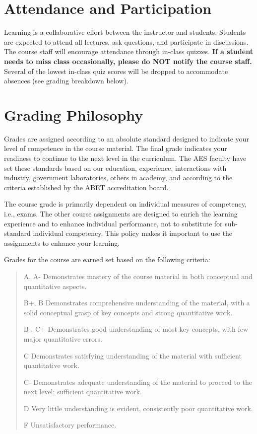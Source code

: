 \documentclass[9pt]{article}
\begin{document}
\section*{Attendance and Participation}

Learning is a collaborative effort between the instructor and students. Students are expected to attend all lectures, ask questions, and participate in discussions. The course staff will encourage attendance through in-class quizzes. \textbf{If a student needs to miss class occasionally, please do NOT notify the course staff.} Several of the lowest in-class quiz scores will be dropped to accommodate absences (see grading breakdown below).

\section*{Grading Philosophy}

Grades are assigned according to an absolute standard designed to
indicate your level of competence in the course material. The final
grade indicates your readiness to continue to the next level in the
curriculum. {The AES faculty have set these standards based on our
education, experience, interactions with industry, government
laboratories, others in academy, and according to the criteria
established by the ABET accreditation board}.

The course grade is primarily dependent on individual measures of
competency, i.e., exams. The other course assignments are designed to
enrich the learning experience and to enhance individual performance,
not to substitute for sub-standard individual competency. This policy
makes it important to use the assignments to enhance your learning.

Grades for the course are earned set based on the following criteria:
\begin{quote}
A, A- Demonstrates mastery of the course material in both conceptual and
quantitative aspects.

B+, B Demonstrates comprehensive understanding of the material, with a
solid conceptual grasp of key concepts and strong quantitative work.

B-, C+ Demonstrates good understanding of most key concepts, with few
major quantitative errors.

C Demonstrates satisfying understanding of the material with sufficient
quantitative work.

C- Demonstrates adequate understanding of the material to proceed to the
next level; sufficient quantitative work.

D Very little understanding is evident, consistently poor quantitative
work.

F Unsatisfactory performance.
\end{quote}
\end{document}
